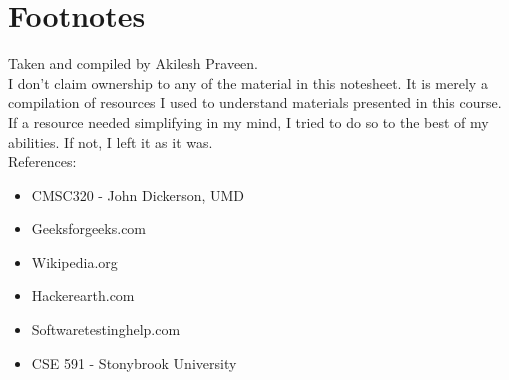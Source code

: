 \documentclass[english, 10pt]{article}
\begin{document}
\section{Footnotes}

Taken and compiled by Akilesh Praveen.\\

I don't claim ownership to any of the material in this notesheet. It is merely a compilation of resources I used to understand materials presented in this course. If a resource needed simplifying in my mind, I tried to do so to the best of my abilities. If not, I left it as it was.\\

References:
\begin{itemize}
	\item CMSC320 - John Dickerson, UMD
	\item Geeksforgeeks.com
	\item Wikipedia.org
	\item Hackerearth.com
	\item Softwaretestinghelp.com
	\item CSE 591 - Stonybrook University
\end{itemize}
\end{document}
